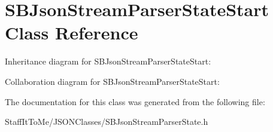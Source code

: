 \hypertarget{interface_s_b_json_stream_parser_state_start}{
\section{\-S\-B\-Json\-Stream\-Parser\-State\-Start \-Class \-Reference}
\label{interface_s_b_json_stream_parser_state_start}
}


\-Inheritance diagram for \-S\-B\-Json\-Stream\-Parser\-State\-Start\-:


\-Collaboration diagram for \-S\-B\-Json\-Stream\-Parser\-State\-Start\-:


\-The documentation for this class was generated from the following file\-:\begin{DoxyCompactItemize}
\item 
\-Staff\-It\-To\-Me/\-J\-S\-O\-N\-Classes/\-S\-B\-Json\-Stream\-Parser\-State.\-h\end{DoxyCompactItemize}
